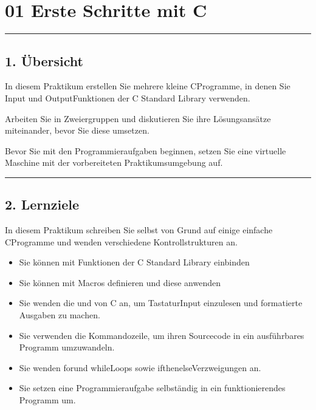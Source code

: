 \documentclass[a4paper,10pt,english]{report}
\begin{document}
\chapter{01 \sphinxhyphen{} Erste Schritte mit C}
\label{\detokenize{P01_Erste_Schritte_mit_C/README:erste-schritte-mit-c}}\label{\detokenize{P01_Erste_Schritte_mit_C/README::doc}}

\bigskip\hrule\bigskip



\section{1. Übersicht}
\label{\detokenize{P01_Erste_Schritte_mit_C/README:ubersicht}}
\sphinxAtStartPar
In diesem Praktikum erstellen Sie mehrere kleine C\sphinxhyphen{}Programme, in denen Sie Input\sphinxhyphen{} und Output\sphinxhyphen{}Funktionen der C Standard Library verwenden.

\sphinxAtStartPar
Arbeiten Sie in Zweiergruppen und diskutieren Sie ihre Lösungsansätze miteinander, bevor Sie diese umsetzen.

\sphinxAtStartPar
Bevor Sie mit den Programmieraufgaben beginnen, setzen Sie eine virtuelle Maschine mit der vorbereiteten Praktikumsumgebung auf.


\bigskip\hrule\bigskip



\section{2. Lernziele}
\label{\detokenize{P01_Erste_Schritte_mit_C/README:lernziele}}
\sphinxAtStartPar
In diesem Praktikum schreiben Sie selbst von Grund auf einige einfache C\sphinxhyphen{}Programme und wenden verschiedene Kontrollstrukturen an.
\begin{itemize}
\item {} 
\sphinxAtStartPar
Sie können mit  Funktionen der C Standard Library einbinden

\item {} 
\sphinxAtStartPar
Sie können mit  Macros definieren und diese anwenden

\item {} 
\sphinxAtStartPar
Sie wenden die  und  von C an, um Tastatur\sphinxhyphen{}Input einzulesen und formatierte Ausgaben zu machen.

\item {} 
\sphinxAtStartPar
Sie verwenden die Kommandozeile, um ihren Sourcecode in ein ausführbares Programm umzuwandeln.

\item {} 
\sphinxAtStartPar
Sie wenden for\sphinxhyphen{}und while\sphinxhyphen{}Loops sowie if\sphinxhyphen{}then\sphinxhyphen{}else\sphinxhyphen{}Verzweigungen an.

\item {} 
\sphinxAtStartPar
Sie setzen eine Programmieraufgabe selbständig in ein funktionierendes Programm um.

\end{itemize}
\end{document}
